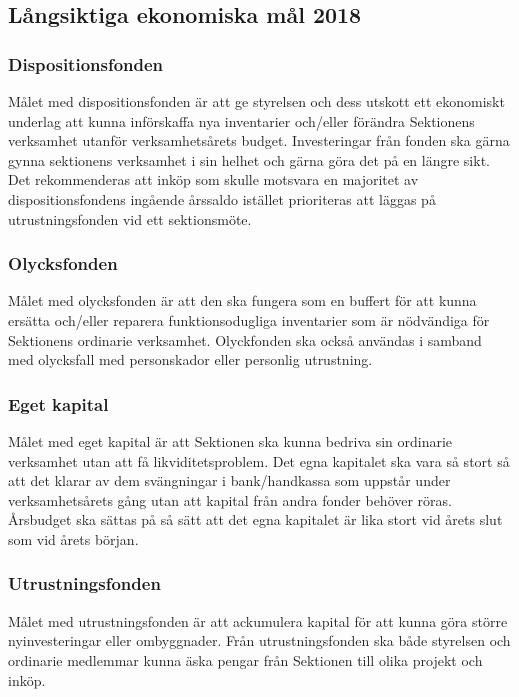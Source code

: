 \documentclass[../_main/handlingar.tex]{subfiles}
\begin{document}
\subsection*{Långsiktiga ekonomiska mål 2018}

\subsubsection*{Dispositionsfonden}
Målet med dispositionsfonden är att ge styrelsen och dess utskott ett ekonomiskt underlag att kunna införskaffa nya inventarier och/eller förändra Sektionens verksamhet utanför verksamhetsårets budget. Investeringar från fonden ska gärna gynna sektionens verksamhet i sin helhet och gärna göra det på en längre sikt. Det rekommenderas att inköp som skulle motsvara en majoritet av dispositionsfondens ingående årssaldo istället prioriteras att läggas på utrustningsfonden vid ett sektionsmöte.

\subsubsection*{Olycksfonden}
Målet med olycksfonden är att den ska fungera som en buffert för att kunna ersätta och/eller reparera funktionsodugliga inventarier som är nödvändiga för Sektionens ordinarie verksamhet. Olyckfonden ska också användas i samband med olycksfall med personskador eller personlig utrustning.

\subsubsection*{Eget kapital}
Målet med eget kapital är att Sektionen ska kunna bedriva sin ordinarie verksamhet utan att få likviditetsproblem. Det egna kapitalet ska vara så stort så att det klarar av dem svängningar i bank/handkassa som uppstår under verksamhetsårets gång utan att kapital från andra fonder behöver röras. Årsbudget ska sättas på så sätt att det egna kapitalet är lika stort vid årets slut som vid årets början.

\subsubsection*{Utrustningsfonden}
Målet med utrustningsfonden är att ackumulera kapital för att kunna göra större nyinvesteringar eller ombyggnader. Från utrustningsfonden ska både styrelsen och ordinarie medlemmar kunna äska pengar från Sektionen till olika projekt och inköp.
\end{document}
